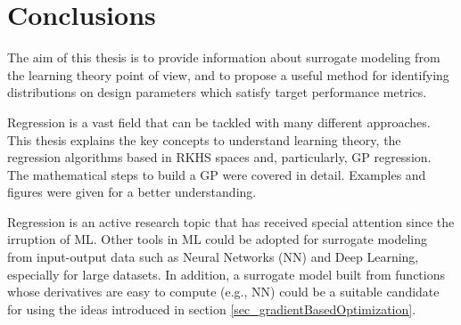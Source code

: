 \chapter{Conclusions} \label{chapter_conclusions} 

The aim of this thesis is to provide information about surrogate modeling from the learning theory point of view, and to propose a useful method for identifying distributions on design parameters which satisfy target performance metrics.

Regression is a vast field that can be tackled with many different approaches.
This thesis explains the key concepts to understand learning theory, the regression algorithms based in RKHS spaces and, particularly, GP regression.
The mathematical steps to build a GP were covered in detail.
Examples and figures were given for a better understanding.


Regression is an active research topic that has received special attention since the irruption of ML.
Other tools in ML could be adopted for surrogate modeling from input-output data such as Neural Networks (NN) and Deep Learning, especially for large datasets. In addition, a surrogate model built from functions whose derivatives are easy to compute (e.g., NN) could be a suitable candidate for using the ideas introduced in section \ref{sec_gradientBasedOptimization}.

